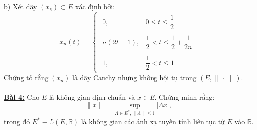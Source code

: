 \documentclass[10pt, a4paper]{article}
\begin{document}
\color{red}b) \color{black}Xét dãy $(x_n)\subset E$ xác định bởi: $$x_n(t)=\begin{cases}
\begin{array}{ll}
0, & 0\le t\le\dfrac12\\\\
n(2t-1), & \dfrac12<t\le\dfrac12+\dfrac{1}{2n}\\\\
1, & \dfrac12<t\le1
\end{array}
\end{cases}$$
Chứng tỏ rằng $(x_n)$ là dãy Cauchy nhưng không hội tụ trong $(E,\lVert~\cdot~\rVert)$.\\\\
\color{red}\underline{\textbf{Bài 4:}} \color{black}Cho $E$ là không gian định chuẩn và $x\in E$. Chứng minh rằng: $$\lVert x\rVert=\displaystyle\sup_{\Lambda\in E^*,\lVert\Lambda\rVert\le1}|\Lambda x|,$$
trong đó $E^*\equiv L(E,\mathbb R)$ là không gian các ánh xạ tuyến tính liên tục từ $E$ vào $\mathbb R$.

\newpage
\end{document}
